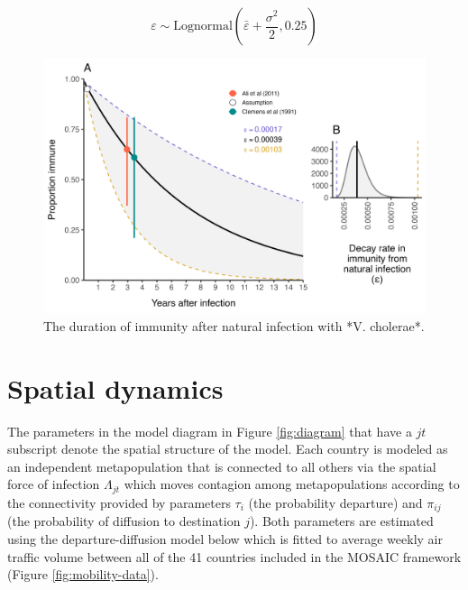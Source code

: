 \documentclass[
]{book}
\begin{document}
\[
\varepsilon \sim \text{Lognormal}(\bar\varepsilon+\frac{\sigma^2}{2}, 0.25)
\]

\begin{figure}

{\centering \includegraphics[width=1\linewidth]{figures/immune_decay} 

}

\caption{The duration of immunity after natural infection with *V. cholerae*.}\label{fig:immune-decay}
\end{figure}

\section{Spatial dynamics}\label{spatial-dynamics}

The parameters in the model diagram in Figure \ref{fig:diagram} that have a \(jt\) subscript denote the spatial structure of the model. Each country is modeled as an independent metapopulation that is connected to all others via the spatial force of infection \(\Lambda_{jt}\) which moves contagion among metapopulations according to the connectivity provided by parameters \(\tau_i\) (the probability departure) and \(\pi_{ij}\) (the probability of diffusion to destination \(j\)). Both parameters are estimated using the departure-diffusion model below which is fitted to average weekly air traffic volume between all of the 41 countries included in the MOSAIC framework (Figure \ref{fig:mobility-data}).
\end{document}
